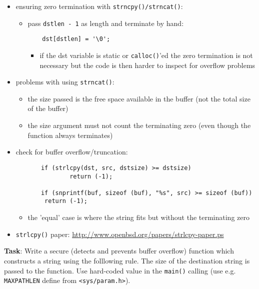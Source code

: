 \begin{itemize}
\item ensuring zero termination with \texttt{strncpy()/strncat()}:
  \begin{itemize}
  \item pass \texttt{dstlen - 1} as length and terminate by hand:
    \begin{verbatim}
    dst[dstlen] = '\0';
    \end{verbatim}
    \begin{itemize}
    \item if the dst variable is static or \texttt{calloc()}'ed the zero
      termination is not necessary but the code is then harder to inspect
      for overflow problems
    \end{itemize}
  \end{itemize}
\item problems with using \texttt{strncat()}:
  \begin{itemize}
  \item the size passed is the free space available in the buffer (not the
    total size of the buffer)
  \item the size argument must not count the terminating zero
    (even though the function always terminates)
  \end{itemize}
\item check for buffer overflow/truncation:
\begin{verbatim}
       if (strlcpy(dst, src, dstsize) >= dstsize)
               return (-1);

       if (snprintf(buf, sizeof (buf), "%s", src) >= sizeof (buf))
		return (-1);
\end{verbatim}
  \begin{itemize}
  \item the 'equal' case is where the string fits but without the
     terminating zero
  \end{itemize}
  \item \texttt{strlcpy()} paper:
    \url{http://www.openbsd.org/papers/strlcpy-paper.ps}
\end{itemize}

{\bf Task}: Write a secure (detects and prevents buffer overflow) function 
           which constructs a string using the
          folllowing rule. The size of
	  the destination string is passed to the function.
	  Use hard-coded value in the \texttt{main()} calling 
	  (use e.g. \texttt{MAXPATHLEN} def{}ine from \texttt{<sys/param.h>}).

